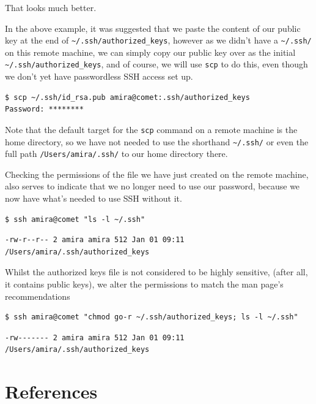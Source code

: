 \documentclass[
]{krantz}
\begin{document}
That looks much better.

In the above example, it was suggested that we paste the content of
our public key at the end of \texttt{\textasciitilde{}/.ssh/authorized\_keys}, however as
we didn't have a \texttt{\textasciitilde{}/.ssh/} on this remote machine, we can simply
copy our public key over as the initial \texttt{\textasciitilde{}/.ssh/authorized\_keys},
and of course, we will use \texttt{scp} to do this, even though we don't
yet have passwordless SSH access set up.

\begin{verbatim}
$ scp ~/.ssh/id_rsa.pub amira@comet:.ssh/authorized_keys
Password: ********
\end{verbatim}

Note that the default target for the \texttt{scp} command on a remote
machine is the home directory, so we have not needed to use the
shorthand \texttt{\textasciitilde{}/.ssh/} or even the full path \texttt{/Users/amira/.ssh/} to
our home directory there.

Checking the permissions of the file we have just created on
the remote machine, also serves to indicate that we no longer
need to use our password, because we now have what's needed
to use SSH without it.

\begin{verbatim}
$ ssh amira@comet "ls -l ~/.ssh"
\end{verbatim}

\begin{verbatim}
-rw-r--r-- 2 amira amira 512 Jan 01 09:11 /Users/amira/.ssh/authorized_keys
\end{verbatim}

Whilst the authorized keys file is not considered to be highly sensitive,
(after all, it contains public keys), we alter the permissions to match
the man page's recommendations

\begin{verbatim}
$ ssh amira@comet "chmod go-r ~/.ssh/authorized_keys; ls -l ~/.ssh"
\end{verbatim}

\begin{verbatim}
-rw------- 2 amira amira 512 Jan 01 09:11 /Users/amira/.ssh/authorized_keys
\end{verbatim}

\hypertarget{references}{%
\chapter{References}\label{references}}
\end{document}
